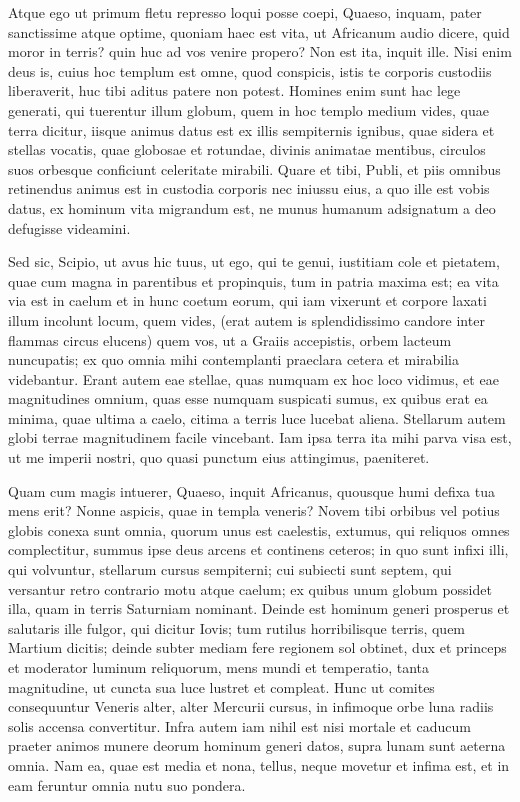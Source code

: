  Atque ego ut primum fletu represso loqui posse coepi, Quaeso, inquam, pater sanctissime atque optime, quoniam haec est vita, ut Africanum audio dicere, quid moror in terris? quin huc ad vos venire propero? Non est ita, inquit ille. Nisi enim deus is, cuius hoc templum est omne, quod conspicis, istis te corporis custodiis liberaverit, huc tibi aditus patere non potest. Homines enim sunt hac lege generati, qui tuerentur illum globum, quem in hoc templo medium vides, quae terra dicitur, iisque animus datus est ex illis sempiternis ignibus, quae sidera et stellas vocatis, quae globosae et rotundae, divinis animatae mentibus, circulos suos orbesque conficiunt celeritate mirabili. Quare et tibi, Publi, et piis omnibus retinendus animus est in custodia corporis nec iniussu eius, a quo ille est vobis datus, ex hominum vita migrandum est, ne munus humanum adsignatum a deo defugisse videamini.

 Sed sic, Scipio, ut avus hic tuus, ut ego, qui te genui, iustitiam cole et pietatem, quae cum magna in parentibus et propinquis, tum in patria maxima est; ea vita via est in caelum et in hunc coetum eorum, qui iam vixerunt et corpore laxati illum incolunt locum, quem vides, (erat autem is splendidissimo candore inter flammas circus elucens) quem vos, ut a Graiis accepistis, orbem lacteum nuncupatis; ex quo omnia mihi contemplanti praeclara cetera et mirabilia videbantur. Erant autem eae stellae, quas numquam ex hoc loco vidimus, et eae magnitudines omnium, quas esse numquam suspicati sumus, ex quibus erat ea minima, quae ultima a caelo, citima a terris luce lucebat aliena. Stellarum autem globi terrae magnitudinem facile vincebant. Iam ipsa terra ita mihi parva visa est, ut me imperii nostri, quo quasi punctum eius attingimus, paeniteret.

 Quam cum magis intuerer, Quaeso, inquit Africanus, quousque humi defixa tua mens erit? Nonne aspicis, quae in templa veneris? Novem tibi orbibus vel potius globis conexa sunt omnia, quorum unus est caelestis, extumus, qui reliquos omnes complectitur, summus ipse deus arcens et continens ceteros; in quo sunt infixi illi, qui volvuntur, stellarum cursus sempiterni; cui subiecti sunt septem, qui versantur retro contrario motu atque caelum; ex quibus unum globum possidet illa, quam in terris Saturniam nominant. Deinde est hominum generi prosperus et salutaris ille fulgor, qui dicitur Iovis; tum rutilus horribilisque terris, quem Martium dicitis; deinde subter mediam fere regionem sol obtinet, dux et princeps et moderator luminum reliquorum, mens mundi et temperatio, tanta magnitudine, ut cuncta sua luce lustret et compleat. Hunc ut comites consequuntur Veneris alter, alter Mercurii cursus, in infimoque orbe luna radiis solis accensa convertitur. Infra autem iam nihil est nisi mortale et caducum praeter animos munere deorum hominum generi datos, supra lunam sunt aeterna omnia. Nam ea, quae est media et nona, tellus, neque movetur et infima est, et in eam feruntur omnia nutu suo pondera.


